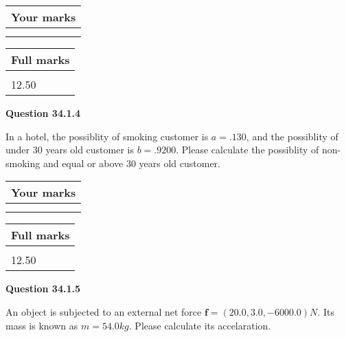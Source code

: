 \documentclass[12pt]{article}
\begin{document}
 
 
 

 
 
\vspace{0.3in}
  
\vspace{0.2in}
  
         \begin{tabular}{|l|}
\hline
 Your marks  \\
\hline
 \\ 
 \\ 
\hline
\end{tabular}
\hspace{0.05in} \begin{tabular}{|l|}
\hline
 Full marks  \\
\hline
 \\ 
12.50 \\
\hline
\end{tabular}
{\textbf{\Large{Question
34.1.4 
}}}
  
  
In a hotel, the possiblity of  %
smoking customer is
$a =  %
.130$, and the possiblity of  %
 under 30 years old customer is $ b =  %
.9200$.
Please calculate the possiblity of  %
 non-smoking and  %
equal or above 30 years old customer.
 

 

 
\vspace{0.3in}
  
\vspace{0.2in}
  
         \begin{tabular}{|l|}
\hline
 Your marks  \\
\hline
 \\ 
 \\ 
\hline
\end{tabular}
\hspace{0.05in} \begin{tabular}{|l|}
\hline
 Full marks  \\
\hline
 \\ 
12.50 \\
\hline
\end{tabular}
{\textbf{\Large{Question
34.1.5 
}}}
  
  
 
An object is subjected to an external net force $\mathbf{f}=(
20.0,  %
3.0,
-6000.0  )N$. Its mass is known as
$m= %
54.0 kg$. Please calculate its accelaration.
 
 
\end{document}

